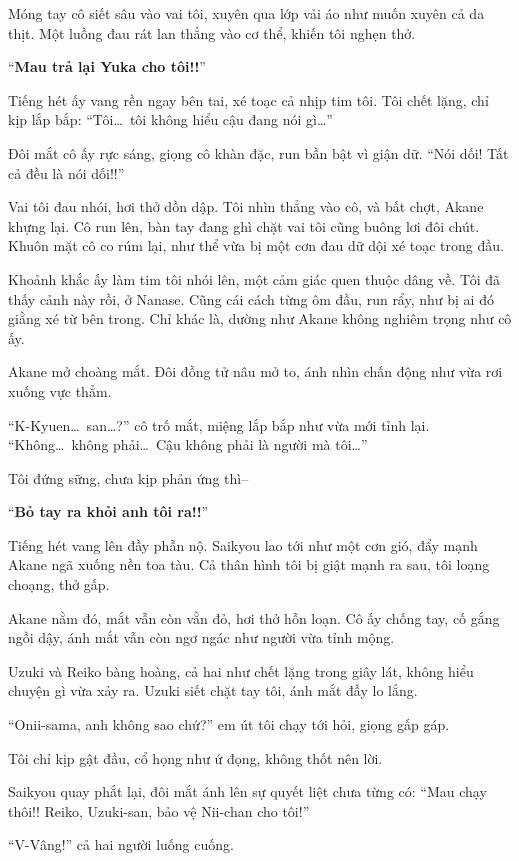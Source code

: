 \documentclass[../main.tex]{subfiles}
\begin{document}
Móng tay cô siết sâu vào vai tôi, xuyên qua lớp vải áo như muốn xuyên cả da thịt. Một luồng đau rát lan thẳng vào cơ thể, khiến tôi nghẹn thở.

``\textbf{Mau trả lại Yuka cho tôi!!}''

Tiếng hét ấy vang rền ngay bên tai, xé toạc cả nhịp tim tôi. Tôi chết lặng, chỉ kịp lắp bắp: ``Tôi\dots\ tôi không hiểu cậu đang nói gì\dots''

Đôi mắt cô ấy rực sáng, giọng cô khàn đặc, run bần bật vì giận dữ. ``Nói dối! Tất cả đều là nói dối!!''

Vai tôi đau nhói, hơi thở dồn dập. Tôi nhìn thẳng vào cô, và bất chợt, Akane khựng lại. Cô run lên, bàn tay đang ghì chặt vai tôi cũng buông lơi đôi chút. Khuôn mặt cô co rúm lại, như thể vừa bị một cơn đau dữ dội xé toạc trong đầu.

Khoảnh khắc ấy làm tim tôi nhói lên, một cảm giác quen thuộc dâng về. Tôi đã thấy cảnh này rồi, ở Nanase. Cũng cái cách từng ôm đầu, run rẩy, như bị ai đó giằng xé từ bên trong. Chỉ khác là, dường như Akane không nghiêm trọng như cô ấy.

Akane mở choàng mắt. Đôi đồng tử nâu mở to, ánh nhìn chấn động như vừa rơi xuống vực thẳm.

``K-Kyuen\dots\ san\dots?'' cô trố mắt, miệng lắp bắp như vừa mới tỉnh lại. ``Không\dots\ không phải\dots\ Cậu không phải là người mà tôi\dots''

Tôi đứng sững, chưa kịp phản ứng thì--

``\textbf{Bỏ tay ra khỏi anh tôi ra!!}''

Tiếng hét vang lên đầy phẫn nộ. Saikyou lao tới như một cơn gió, đẩy mạnh Akane ngã xuống nền toa tàu. Cả thân hình tôi bị giật mạnh ra sau, tôi loạng choạng, thở gấp.

Akane nằm đó, mắt vẫn còn vằn đỏ, hơi thở hỗn loạn. Cô ấy chống tay, cố gắng ngồi dậy, ánh mắt vẫn còn ngơ ngác như người vừa tỉnh mộng.

Uzuki và Reiko bàng hoàng, cả hai như chết lặng trong giây lát, không hiểu chuyện gì vừa xảy ra. Uzuki siết chặt tay tôi, ánh mắt đầy lo lắng.

``Onii-sama, anh không sao chứ?'' em út tôi chạy tới hỏi, giọng gấp gáp.

Tôi chỉ kịp gật đầu, cổ họng như ứ đọng, không thốt nên lời.

Saikyou quay phắt lại, đôi mắt ánh lên sự quyết liệt chưa từng có: ``Mau chạy thôi!! Reiko, Uzuki-san, bảo vệ Nii-chan cho tôi!''

``V-Vâng!'' cả hai người luống cuống.
\end{document}
